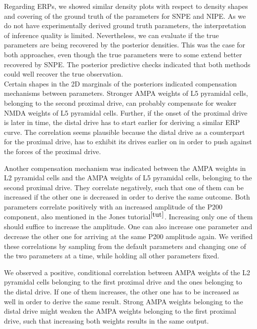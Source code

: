 \documentclass[12pt]{extreport}
\begin{document}
Regarding ERPs, we showed similar density plots with respect to density shapes and covering of the ground truth of the parameters for SNPE and NIPE. As we do not have experimentally derived ground truth parameters, the interpretation of inference quality is limited. Nevertheless, we can evaluate if the true parameters are being recovered by the posterior densities. This was the case for both approaches, even though the true parameters were to some extend better recovered by SNPE. The posterior predictive checks indicated that both methods could well recover the true observation. \\

Certain shapes in the 2D marginals of the posteriors indicated compensation mechanisms between parameters. Stronger AMPA weights of L5 pyramidal cells, belonging to the second proximal drive, can probably compensate for weaker NMDA weights of L5 pyramidal cells. Further, if the onset of the proximal drive is later in time, the distal drive has to start earlier for deriving a similar ERP curve. The correlation seems plausible because the distal drive as a counterpart for the proximal drive, has to exhibit its drives earlier on in order to push against the forces of the proximal drive. 

Another compensation mechanism was indicated between the AMPA weights in L2 pyramidal cells and the AMPA weights of L5 pyramidal cells, belonging to the second proximal drive. They correlate negatively, such that one of them can be increased if the other one is decreased in order to derive the same outcome. Both parameters correlate positively with an increased amplitude of the P200 component, also mentioned in the Jones tutorial$^{\ref{tut} }$. Increasing only one of them should suffice to increase the amplitude. One can also increase one parameter and decrease the other one for arriving at the same P200 amplitude again.
We verified these correlations by sampling from the default parameters and changing one of the two parameters at a time, while holding all other parameters fixed.

We observed a positive, conditional correlation between AMPA weights of the L2 pyramidal cells belonging to the first proximal drive and the ones belonging to the distal drive. If one of them increases, the other one has to be increased as well in order to derive the same result. Strong AMPA weights belonging to the distal drive might weaken the AMPA weights belonging to the first proximal drive, such that increasing both weights results in the same output.\\
\end{document}
